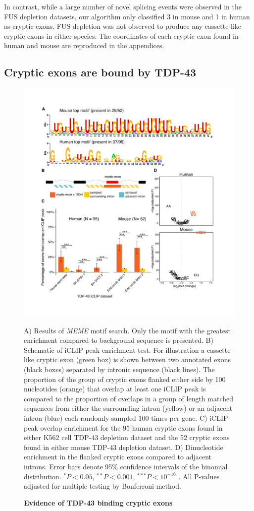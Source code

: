In contrast, while a large number of novel splicing events were observed in the FUS depletion datasets, our algorithm only classified 3 in mouse and 1 in human as cryptic exons. FUS depletion was not observed to produce any cassette-like cryptic exons in either species. The coordinates of each cryptic exon found in human and mouse are reproduced in the appendices.

\subsection{Cryptic exons are bound by TDP-43}

\begin{figure}[h!]
	\centering
	\includegraphics[width=\textwidth]{Figures/03_cryptic_exons/Figure_2_motif_iCLIP.png} 
	\caption{\textbf{Evidence of TDP-43 binding cryptic exons}}
	A) Results of \emph{MEME} motif search. Only the motif with the greatest enrichment compared to background sequence is presented. B) Schematic of iCLIP peak enrichment test. For illustration a cassette-like cryptic exon (green box) is shown between two annotated exons (black boxes) separated by intronic sequence (black lines). The proportion of the group of cryptic exons flanked either side by 100 nucleotides (orange) that overlap at least one iCLIP peak is compared to the proportion of overlaps in a group of length matched sequences from either the surrounding intron (yellow) or an adjacent intron (blue) each randomly sampled 100 times per gene. C) iCLIP peak overlap enrichment for the 95 human cryptic exons found in either K562 cell TDP-43 depletion dataset and the 52 cryptic exons found in either mouse TDP-43 depletion dataset. D) Dinucleotide enrichment in the flanked cryptic exons compared to adjacent introns. Error bars denote 95\% confidence intervals of the binomial distribution. $^* P < 0.05 $, $^{**} P < 0.001$, $^{***} P < 10^{-16}$ . All P-values adjusted for multiple testing by Bonferroni method.

\end{figure}
